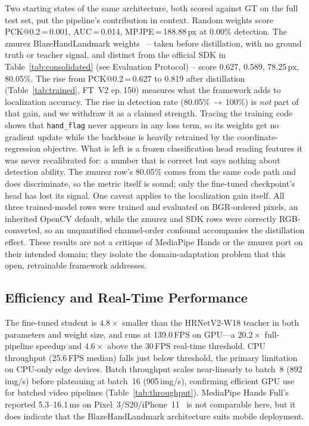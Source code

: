\documentclass[11pt,conference,a4paper]{APSIPA2026}
\begin{document}
Two starting states of the same architecture, both scored against GT
on the full test set, put the pipeline's contribution in context.
Random weights score PCK@0.2\,=\,0.001, AUC\,=\,0.014,
MPJPE\,=\,188.88\,px at 0.00\% detection. The zmurez
BlazeHandLandmark weights~\cite{mediapipepytorch2021} -- taken
before distillation, with no ground truth or teacher signal, and
distinct from the official SDK in Table~\ref{tab:consolidated} (see
Evaluation Protocol) -- score 0.627, 0.589, 78.25\,px, 80.05\%. The
rise from PCK@0.2\,=\,0.627 to 0.819 after distillation
(Table~\ref{tab:trained}, FT~V2 ep.\,150) measures what the
framework adds to localization accuracy. The rise in detection rate
(80.05\%\,$\to$\,100\%) is \emph{not} part of that gain, and we
withdraw it as a claimed strength. Tracing the training code shows
that \texttt{hand\_flag} never appears in any loss term, so its
weights get no gradient update while the backbone is heavily
retrained by the coordinate-regression objective. What is left is a
frozen classification head reading features it was never
recalibrated for: a number that is correct but says nothing about
detection ability. The zmurez row's 80.05\% comes from the same code
path and does discriminate, so the metric itself is sound; only the
fine-tuned checkpoint's head has lost its signal. One caveat applies
to the localization gain itself. All three trained-model rows were
trained and evaluated on BGR-ordered pixels, an inherited OpenCV
default, while the zmurez and SDK rows were correctly RGB-converted,
so an unquantified channel-order confound accompanies the
distillation effect. These results are not a critique of MediaPipe
Hands or the zmurez port on their intended domain; they isolate the
domain-adaptation problem that this open, retrainable framework
addresses.

\subsection{Efficiency and Real-Time Performance}
\label{sec:efficiency}

The fine-tuned student is $4.8{\times}$ smaller than the HRNetV2-W18
teacher in both parameters and weight size, and runs at 139.0\,FPS on
GPU---a $20.2{\times}$ full-pipeline speedup and $4.6{\times}$ above
the 30\,FPS real-time threshold. CPU throughput (25.6\,FPS median)
falls just below threshold, the primary limitation on CPU-only edge
devices. Batch throughput scales near-linearly to batch~8
(892\,img/s) before plateauing at batch~16 (905\,img/s), confirming
efficient GPU use for batched video pipelines
(Table~\ref{tab:throughput}). MediaPipe Hands Full's reported
5.3--16.1\,ms on Pixel~3/S20/iPhone~11~\cite{mediapipe2020} is not
comparable here, but it does indicate that the BlazeHandLandmark
architecture suits mobile deployment.
\end{document}
